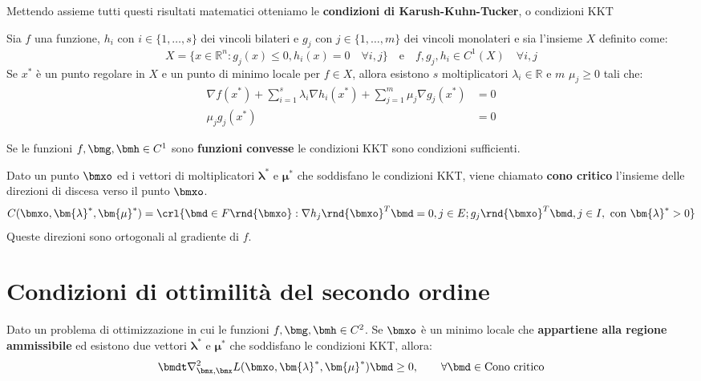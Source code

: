 \documentclass[\main/main.tex]{subfiles}
\begin{document}
Mettendo assieme tutti questi risultati matematici otteniamo le \textbf{condizioni di Karush-Kuhn-Tucker}, o condizioni KKT\@

\begin{theorem}
	Sia \(f \) una funzione, \(h_i \text{ con } i \in \{1, \ldots, s\}\) dei vincoli bilateri e \(g_j \text{ con } j \in \{1, \ldots, m\}\) dei vincoli monolateri e sia l'insieme $X$ definito come:
	\[
		X  = \{x \in \mathbb{R}^n: g_j(x) \leq 0, h_i(x) = 0 \quad \forall i, j \} \quad \text{e} \quad f, g_j, h_i \in C^1(X) \quad \forall i,j
	\]	Se $x^*$ è un punto regolare in $X$ e un punto di minimo locale per \(f \in X\), allora esistono $s$ moltiplicatori $\lambda_i \in \mathbb{R}$ e $m$ $\mu_j \geq 0$ tali che:
	\begin{align*}
		\nabla f(x^*) + \sum_{i=1}^s \lambda_i \nabla h_i(x^*) + \sum_{j=1}^m \mu_j \nabla g_j(x^*) & = 0 \\
		\mu_j g_j(x^*)                                                                              & = 0
	\end{align*}
\end{theorem}

\begin{theorem}
	Se le funzioni \(f, \bmg, \bmh \in C^1\) sono \textbf{funzioni convesse} le condizioni KKT sono condizioni sufficienti.
\end{theorem}

\begin{definition}
	Dato un punto \(\bmxo \) ed i vettori di moltiplicatori \(\bm{\lambda}^*\) e \(\bm{\mu}^*\) che soddisfano le condizioni KKT, viene chiamato \textbf{cono critico} l'insieme delle direzioni di discesa verso il punto \(\bmxo \).
	\[
		C(\bmxo, \bm{\lambda}^*, \bm{\mu}^*) = \crl{\bmd \in F\rnd{\bmxo} : \nabla {h_j\rnd{\bmxo}}^T\bmd = 0, j \in E; {g_j\rnd{\bmxo}}^T\bmd, j \in I, \text{ con }\bm{\lambda}^*>0}
	\]	Queste direzioni sono ortogonali al gradiente di \(f\).
\end{definition}

\section{Condizioni di ottimilità del secondo ordine}

\begin{theorem}
	Dato un problema di ottimizzazione in cui le funzioni \(f, \bmg, \bmh \in C^2\). Se \(\bmxo \) è un minimo locale che \textbf{appartiene alla regione ammissibile} ed esistono due vettori \(\bm{\lambda}^*\) e \(\bm{\mu}^*\) che soddisfano le condizioni KKT, allora:
	\[
		\bmdt \nabla^2_{\bmx, \bmx} L(\bmxo, \bm{\lambda}^*, \bm{\mu}^*)\bmd \geq 0, \qquad \forall \bmd \in \text{Cono critico}
	\]\end{theorem}
\end{document}
